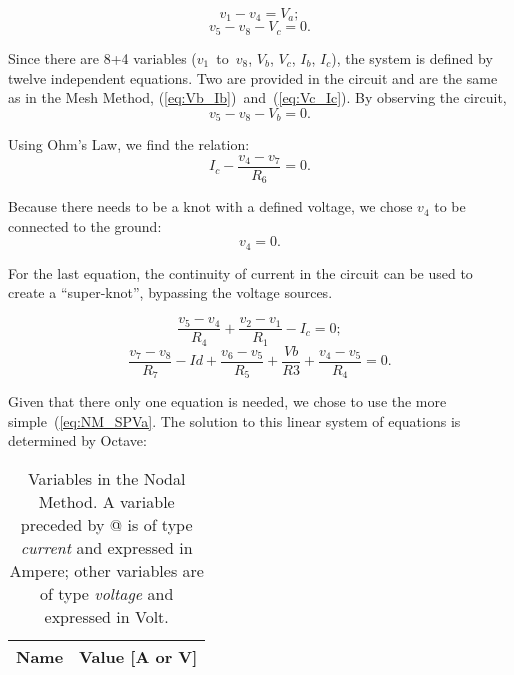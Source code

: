 \begin{equation}
  v_1 - v_4 = V_a;
  \label{eq:NM_Va}
\end{equation}
\begin{equation}
  v_5 - v_8 - V_c = 0.
  \label{eq:NM_Vc}
\end{equation}

Since there are 8+4 variables ($v_1$~to~$v_8$, $V_b$, $V_c$, $I_b$, $I_c$), the system is defined by twelve independent equations. Two are provided in the circuit and are the same as in the Mesh Method, (\ref{eq:Vb_Ib})~and~(\ref{eq:Vc_Ic}).
By observing the circuit,
\begin{equation}
  v_5 - v_8 - V_b = 0.
  \label{eq:NM_Vb}
\end{equation}

Using Ohm’s Law, we find the relation:
\begin{equation}
  I_c - \frac{v_4-v_7}{R_6} = 0.
  \label{eq:NM_OhmIc}
\end{equation}

Because there needs to be a knot with a defined voltage, we chose $v_4$ to be connected to the ground:
\begin{equation}
  v_4 = 0.
  \label{eq:NM_v4=0}
\end{equation}

For the last equation, the continuity of current in the circuit can be used to create a “super-knot”, bypassing the voltage sources.

\begin{equation}
  \frac{v_5-v_4}{R_4} + \frac{v_2-v_1}{R_1} - I_c = 0;
  \label{eq:NM_SPVa}
\end{equation}
\begin{equation}
  \frac{v_7-v_8}{R_7} - Id + \frac{v_6-v_5}{R_5} + \frac{Vb}{R3} + \frac{v_4-v_5}{R_4} = 0.
  \label{eq:NM_SPVc}
\end{equation}

Given that there only one equation is needed, we chose to use the more simple~(\ref{eq:NM_SPVa}.
The solution to this linear system of equations is determined by Octave:

\begin{table}[h]
  \centering
  \begin{tabular}{|l|r|}
    \hline    
    {\bf Name} & {\bf Value [A or V]} \\ \hline
    
  \end{tabular}
  \caption{Variables in the Nodal Method. A variable preceded by @ is of type {\em current} and expressed in Ampere; other variables are of type {\em voltage} and expressed in Volt.}
  \label{tab:Nos}
\end{table}

